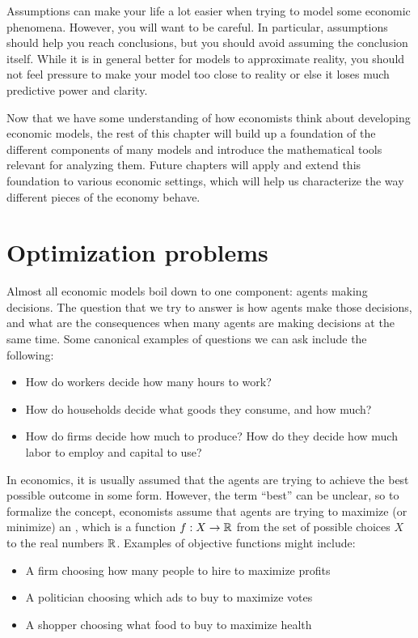 Assumptions can make your life a lot easier when trying to model some economic phenomena. However, you will want to be careful. In particular, assumptions should help you reach conclusions, but you should avoid assuming the conclusion itself. While it is in general better for models to approximate reality, you should not feel pressure to make your model too close to reality or else it loses much predictive power and clarity.

Now that we have some understanding of how economists think about developing economic models, the rest of this chapter will build up a foundation of the different components of many models and introduce the mathematical tools relevant for analyzing them. Future chapters will apply and extend this foundation to various economic settings, which will help us characterize the way different pieces of the economy behave.

\section{Optimization problems}
Almost all economic models boil down to one component: agents making decisions. The question that we try to answer is how agents make those decisions, and what are the consequences when many agents are making decisions at the same time. Some canonical examples of questions we can ask include the following:
\begin{itemize}
    \item How do workers decide how many hours to work?
    \item How do households decide what goods they consume, and how much?
    \item How do firms decide how much to produce? How do they decide how much labor to employ and capital to use?
\end{itemize}

In economics, it is usually assumed that the agents are trying to achieve the best possible outcome in some form. However, the term ``best'' can be unclear, so to formalize the concept, economists assume that agents are trying to maximize (or minimize) an , which is a function $f: X \to \mathbb{R}$ from the set of possible choices $X$ to the real numbers $\mathbb{R}$. Examples of objective functions might include:
\begin{itemize}
    \item A firm choosing how many people to hire to maximize profits
    \item A politician choosing which ads to buy to maximize votes
    \item A shopper choosing what food to buy to maximize health
\end{itemize}

